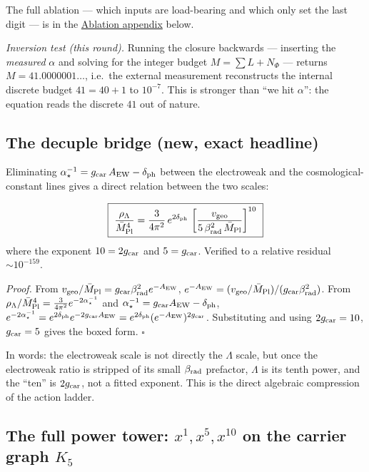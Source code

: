 \noindent The full ablation --- which inputs are load-bearing and which only set the last digit --- is in
the \hyperref[sec:ablation]{Ablation appendix} below.

\emph{Inversion test (this round).} Running the closure backwards --- inserting the \emph{measured}
$\alpha$ and solving for the integer budget $M=\sum L+N_\Phi$ --- returns
$M=41.0000001\ldots$, i.e.\ the external measurement reconstructs the internal discrete budget
$41=40+1$ to $10^{-7}$. This is stronger than ``we hit $\alpha$'': the equation reads the discrete
$41$ out of nature. \mE

\subsection{The decuple bridge (new, exact headline)}

Eliminating $\alpha^{-1}_\star=g_{\mathrm{car}}\,A_{\mathrm{EW}}-\delta_{\mathrm{ph}}$ between the electroweak and the cosmological-constant lines
gives a direct relation between the two scales:

\begin{keybox}
\begin{equation}
  \boxed{\ \frac{\rho_\Lambda}{\Mbar^4}
  =\frac{3}{4\pi^2}\,e^{2\dph}\,
  \left[\frac{v_{\mathrm{geo}}}{5\,\betarad^2\,\Mbar}\right]^{10}\ }
\end{equation}
where the exponent $10=2g_{\mathrm{car}}$ and $5=g_{\mathrm{car}}$. Verified to a relative residual $\sim10^{-159}$.
\end{keybox}

\noindent\emph{Proof.} From $v_{\mathrm{geo}}/\bar M_{\mathrm{Pl}}=g_{\mathrm{car}}\beta_{\mathrm{rad}}^2 e^{-A_{\mathrm{EW}}}$,
$e^{-A_{\mathrm{EW}}}=(v_{\mathrm{geo}}/\bar M_{\mathrm{Pl}})/(g_{\mathrm{car}}\beta_{\mathrm{rad}}^2)$. From
$\rho_\Lambda/\bar M_{\mathrm{Pl}}^4=\tfrac{3}{4\pi^2}e^{-2\alpha^{-1}_\star}$ and $\alpha^{-1}_\star=g_{\mathrm{car}}A_{\mathrm{EW}}-\delta_{\mathrm{ph}}$,
$e^{-2\alpha^{-1}_\star}=e^{2\delta_{\mathrm{ph}}}e^{-2g_{\mathrm{car}}A_{\mathrm{EW}}}=e^{2\delta_{\mathrm{ph}}}(e^{-A_{\mathrm{EW}}})^{2g_{\mathrm{car}}}$. Substituting and using
$2g_{\mathrm{car}}=10$, $g_{\mathrm{car}}=5$ gives the boxed form. $\square$

\smallskip
In words: the electroweak scale is not directly the $\Lambda$ scale, but once the electroweak ratio
is stripped of its small $\beta_{\mathrm{rad}}$ prefactor, $\Lambda$ is its tenth power, and the ``ten'' is
$2g_{\mathrm{car}}$, not a fitted exponent. This is the direct algebraic compression of the action ladder.

\subsection{The full power tower: $x^{1},x^{5},x^{10}$ on the carrier graph $K_5$}

